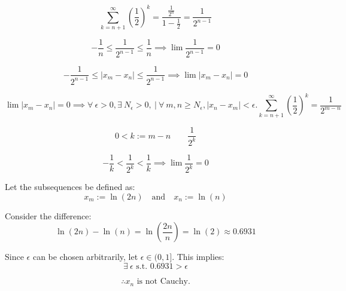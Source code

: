 	\[
		\sum_{k=n+1}^{\infty} \left( \frac{1}{2} \right)^k = \frac{\frac{1}{2^n}}{1-\frac{1}{2}} = \frac{1}{2^{n-1}}
	\]

	\[
		-\frac{1}{n} \leq \frac{1}{2^{n-1}}  \leq \frac{1}{n} \implies \lim \frac{1}{2^{n-1}} = 0
	\]

	\[
		-\frac{1}{2^{n-1}} \leq |x_m - x_n| \leq \frac{1}{2^{n-1}}  \implies  \lim |x_m - x_n| = 0
	\]

	\[
		\lim |x_m - x_n| = 0 \implies \forall~ \epsilon > 0, \exists~  N_\epsilon > 0, ~|~  \forall\ m, n \geq N_\epsilon, |x_n - x_m| < \epsilon.
		\sum_{k=n+1}^{\infty} \left( \frac{1}{2} \right)^k =
		\frac{1}{2^{m-n}}
	\]

	\[
		0 < k := m-n \quad \quad
		\frac{1}{2^{k}}
	\]

	\[
		-\frac{1}{k} < \frac{1}{2^{k}} < \frac{1}{k} \implies \lim \frac{1}{2^k} = 0
	\]

    \qq




		Let the subsequences be defined as:
		\[
			x_m := \ln(2n) \quad \text{and} \quad x_n := \ln(n)
		\]

		Consider the difference:
		\[
			\ln(2n) - \ln(n) = \ln\left(\frac{2n}{n}\right) = \ln(2) \approx 0.6931
		\]

		Since $\epsilon$ can be chosen arbitrarily, let $\epsilon \in (0,1]$. This implies:
		\[
			\exists~ \epsilon \text{ s.t. } 0.6931 > \epsilon
		\]

		\[
			\therefore x_n \text{ is not Cauchy.}
		\]


